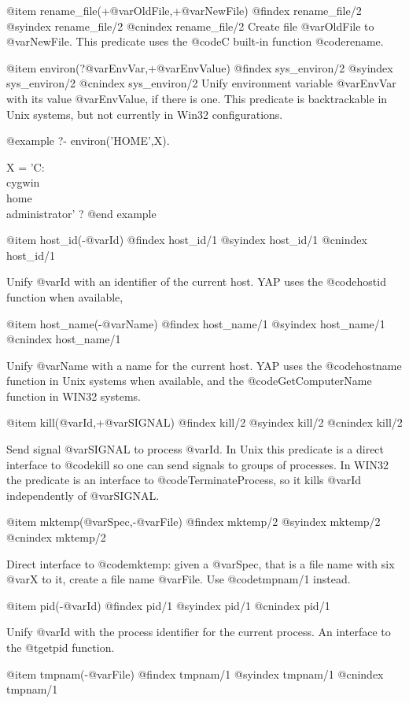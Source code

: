 @item rename_file(+@var{OldFile},+@var{NewFile})
@findex  rename_file/2
@syindex rename_file/2
@cnindex rename_file/2
Create file @var{OldFile} to @var{NewFile}. This predicate uses the
@code{C} built-in function @code{rename}.


@item environ(?@var{EnvVar},+@var{EnvValue})
@findex  sys_environ/2
@syindex sys_environ/2
@cnindex sys_environ/2
Unify environment variable @var{EnvVar} with its value @var{EnvValue},
if there is one. This predicate is backtrackable in Unix systems, but
not currently in Win32 configurations.

@example
   ?- environ('HOME',X).

X = 'C:\\cygwin\\home\\administrator' ?
@end example

@item host_id(-@var{Id})
@findex  host_id/1
@syindex host_id/1
@cnindex host_id/1

Unify @var{Id} with an identifier of the current host. YAP uses the
@code{hostid} function when available, 

@item host_name(-@var{Name})
@findex  host_name/1
@syindex host_name/1
@cnindex host_name/1

Unify @var{Name} with a name for the current host. YAP uses the
@code{hostname} function in Unix systems when available, and the
@code{GetComputerName} function in WIN32 systems. 

@item kill(@var{Id},+@var{SIGNAL})
@findex  kill/2
@syindex kill/2
@cnindex kill/2

Send signal @var{SIGNAL} to process @var{Id}. In Unix this predicate is
a direct interface to @code{kill} so one can send signals to groups of
processes. In WIN32 the predicate is an interface to
@code{TerminateProcess}, so it kills @var{Id} independently of @var{SIGNAL}.

@item mktemp(@var{Spec},-@var{File})
@findex  mktemp/2
@syindex mktemp/2
@cnindex mktemp/2

Direct interface to @code{mktemp}: given a @var{Spec}, that is a file
name with six @var{X} to it, create a file name @var{File}. Use
@code{tmpnam/1} instead.

@item pid(-@var{Id})
@findex  pid/1
@syindex pid/1
@cnindex pid/1

Unify @var{Id} with the process identifier for the current
process. An interface to the @t{getpid} function.

@item tmpnam(-@var{File})
@findex  tmpnam/1
@syindex tmpnam/1
@cnindex tmpnam/1

